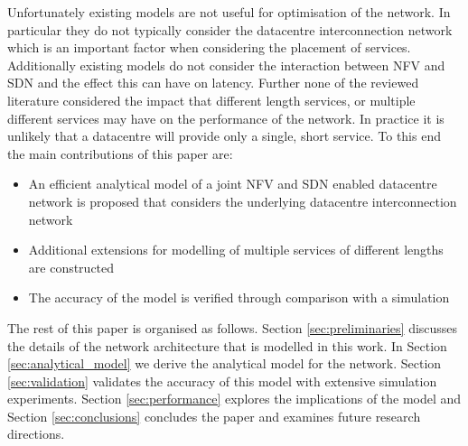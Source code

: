 Unfortunately existing models are not useful for optimisation of the network. In particular they do not typically consider the datacentre interconnection network which is an important factor when considering the placement of services. Additionally existing models do not consider the interaction between NFV and SDN and the effect this can have on latency. Further none of the reviewed literature considered the impact that different length services, or multiple different services may have on the performance of the network. In practice it is unlikely that a datacentre will provide only a single, short service. To this end the main contributions of this paper are:

\begin{itemize}
\item An efficient analytical model of a joint NFV and SDN enabled datacentre network is proposed that considers the underlying datacentre interconnection network
\item Additional extensions for modelling of multiple services of different lengths are constructed
\item The accuracy of the model is verified through comparison with a simulation
\end{itemize}

The rest of this paper is organised as follows. Section \ref{sec:preliminaries} discusses the details of the network architecture that is modelled in this work. In Section \ref{sec:analytical_model} we derive the analytical model for the network. Section \ref{sec:validation} validates the accuracy of this model with extensive simulation experiments. Section \ref{sec:performance} explores the implications of the model and Section \ref{sec:conclusions} concludes the paper and examines future research directions. 